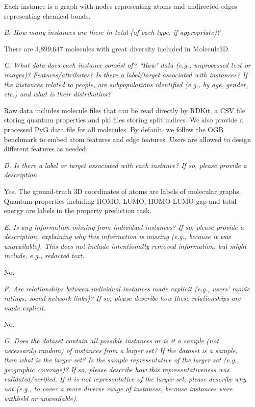 \documentclass{article}
\begin{document}
Each instance is a graph with nodes representing atoms and undirected edges representing chemical bonds. 

\textit{B. How many instances are there in total (of each type, if appropriate)?}

There are 3,899,647 molecules with great diversity included in Molecule3D.

\textit{C. What data does each instance consist of? ``Raw" data (e.g., unprocessed text or images)? Features/attributes? Is there a label/target associated with instances? If the instances related to people, are subpopulations identified (e.g., by age, gender, etc.) and what is their distribution?}

Raw data includes molecule files that can be read directly by RDKit, a CSV file storing quantum properties and pkl files storing split indices. We also provide a processed PyG data file for all molecules. By default, we follow the OGB benchmark to embed atom features and edge features. Users are allowed to design different features as needed. 

\textit{D. Is there a label or target associated with each instance? If so, please provide a description.}

Yes. The ground-truth 3D coordinates of atoms are labels of molecular graphs. Quantum properties including HOMO, LUMO, HOMO-LUMO gap and total energy are labels in the property prediction task.

\textit{E. Is any information missing from individual instances? If so, please provide a description, explaining why this information is missing (e.g., because it was unavailable). This does not include intentionally removed information, but might include, e.g., redacted text.}

No.

\textit{F. Are relationships between individual instances made explicit (e.g., users’ movie ratings, social network links)? If so, please describe how these relationships are made explicit.}

No.

\textit{G. Does the dataset contain all possible instances or is it a sample (not necessarily random) of instances from a larger set? If the dataset is a sample, then what is the larger set? Is the sample representative of the larger set (e.g., geographic coverage)? If so, please describe how this representativeness was validated/verified. If it is not representative of the larger set, please describe why not (e.g., to cover a more diverse range of instances, because instances were withheld or unavailable).}
\end{document}
